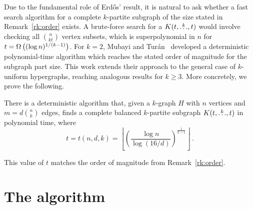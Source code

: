 Due to the fundamental role of Erd\H{o}s' result, %
it is natural to ask whether a fast search algorithm for a complete $k$-partite subgraph of the size stated in Remark~\ref{rk:order} exists.
A brute-force search for a $K(t, \overset{k}{\dots}, t)$ would involve checking all $\binom{n}{kt}$ vertex subsets, which is superpolynomial in $n$ for ${t = \Omega\left((\log n)^{1/(k-1)}\right)}$.
For $k=2$, Mubayi and Tur\'{a}n~\cite{MUBAYI2010174} developed a deterministic polynomial-time algorithm which reaches the stated order of magnitude for the subgraph part size.
This work extends their approach to the general case of $k$-uniform hypergraphs, reaching analogous results for $k \ge 3$.
More concretely, we prove the following.

\begin{theorem} \label{thm:main_theorem}
There is a deterministic algorithm that, given a $k$-graph $H$ with $n$ vertices and $m=d \binom{n}{k}$ edges, finds a complete balanced $k$-partite subgraph $K(t, \overset{k}{\dots}, t)$ in polynomial time, where
\[
    t = t(n, d, k) = \left\lfloor \left( \frac{\log n}{\log (16/d)}  \right)^{\frac{1}{k-1}} \right \rfloor \,.
\]
\end{theorem}
This value of $t$ matches the order of magnitude from Remark~\ref{rk:order}.

\section{The algorithm}\label{sec:finding-a-balanced-$k$-partite-subgraph}

